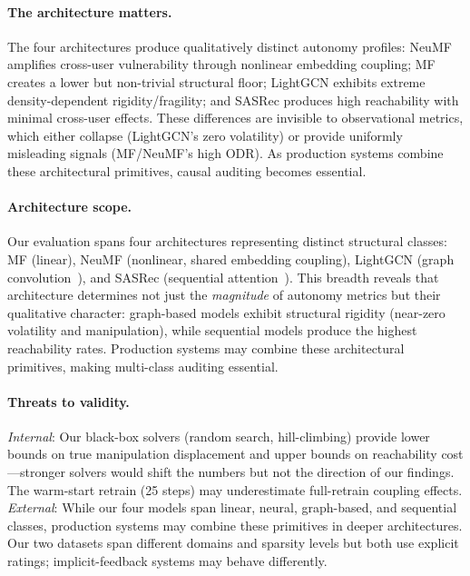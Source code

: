\documentclass[sigconf,anonymous]{acmart}
\begin{document}
\paragraph{The architecture matters.}
The four architectures produce qualitatively distinct autonomy profiles: NeuMF amplifies cross-user vulnerability through nonlinear embedding coupling; MF creates a lower but non-trivial structural floor; LightGCN exhibits extreme density-dependent rigidity/fragility; and SASRec produces high reachability with minimal cross-user effects. These differences are invisible to observational metrics, which either collapse (LightGCN's zero volatility) or provide uniformly misleading signals (MF/NeuMF's high ODR). As production systems combine these architectural primitives, causal auditing becomes essential.

\paragraph{Architecture scope.}
Our evaluation spans four architectures representing distinct structural classes: MF (linear), NeuMF (nonlinear, shared embedding coupling), LightGCN (graph convolution~\cite{he2020lightgcn}), and SASRec (sequential attention~\cite{kang2018self}). This breadth reveals that architecture determines not just the \emph{magnitude} of autonomy metrics but their qualitative character: graph-based models exhibit structural rigidity (near-zero volatility and manipulation), while sequential models produce the highest reachability rates. Production systems may combine these architectural primitives, making multi-class auditing essential.

\paragraph{Threats to validity.}
\emph{Internal}: Our black-box solvers (random search, hill-climbing) provide lower bounds on true manipulation displacement and upper bounds on reachability cost---stronger solvers would shift the numbers but not the direction of our findings. The warm-start retrain (25 steps) may underestimate full-retrain coupling effects.
\emph{External}: While our four models span linear, neural, graph-based, and sequential classes, production systems may combine these primitives in deeper architectures. Our two datasets span different domains and sparsity levels but both use explicit ratings; implicit-feedback systems may behave differently.
\end{document}

